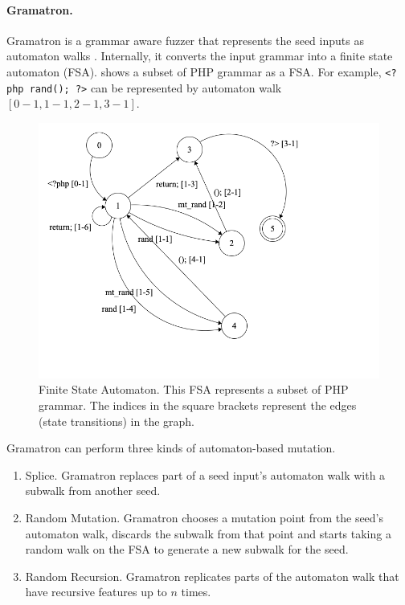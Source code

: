 \paragraph{Gramatron.}
Gramatron is a grammar aware fuzzer that represents the seed inputs as automaton walks \cite{srivastava_payer_2021}. Internally, it converts the input grammar into a finite state automaton (FSA).  shows a subset of PHP grammar as a FSA. For example, \texttt{<?php rand(); ?>} can be represented by automaton walk $[0-1, 1-1, 2-1, 3-1]$.
\begin{figure}[h]
  \centering
  \includegraphics[scale=0.35]{images/fsa.png}
  \caption{Finite State Automaton. This FSA represents a subset of PHP grammar. The indices in the square brackets represent the edges (state transitions) in the graph.}\label{example-fsa}
\end{figure}

Gramatron can perform three kinds of automaton-based mutation.
\begin{enumerate}
    \item Splice. Gramatron replaces part of a seed input's automaton walk with a subwalk from another seed.
    \item Random Mutation. Gramatron chooses a mutation point from the seed's automaton walk, discards the subwalk from that point and starts taking a random walk on the FSA to generate a new subwalk for the seed.
    \item Random Recursion. Gramatron replicates parts of the automaton walk that have recursive features up to $n$ times.
\end{enumerate}

